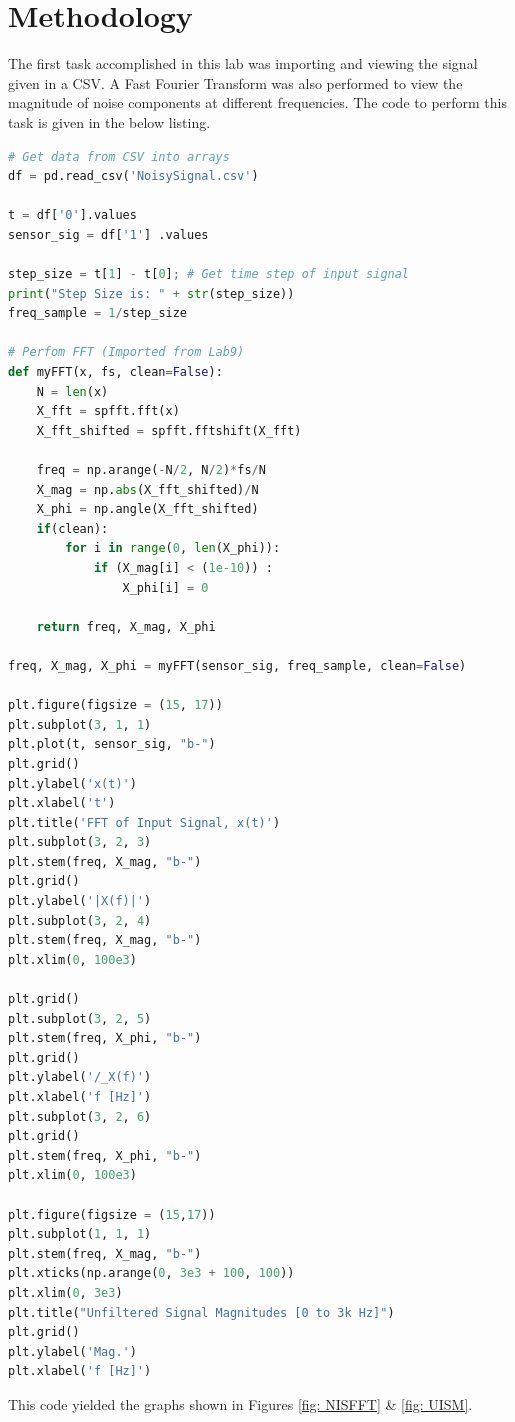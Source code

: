 \documentclass[12pt]{report}
\begin{document}
\section{Methodology}\label{section: Methodology}
The first task accomplished in this lab was importing and viewing the signal given in a CSV. A Fast Fourier Transform was also
performed to view the magnitude of noise components at different frequencies. The code to perform this task is given in the below
listing.

\begin{lstlisting}[language=Python, basicstyle=\footnotesize]
# Get data from CSV into arrays
df = pd.read_csv('NoisySignal.csv')

t = df['0'].values
sensor_sig = df['1'] .values

step_size = t[1] - t[0]; # Get time step of input signal
print("Step Size is: " + str(step_size))
freq_sample = 1/step_size

# Perfom FFT (Imported from Lab9)
def myFFT(x, fs, clean=False):
    N = len(x)
    X_fft = spfft.fft(x)
    X_fft_shifted = spfft.fftshift(X_fft)
    
    freq = np.arange(-N/2, N/2)*fs/N
    X_mag = np.abs(X_fft_shifted)/N
    X_phi = np.angle(X_fft_shifted)
    if(clean):
        for i in range(0, len(X_phi)):
            if (X_mag[i] < (1e-10)) :
                X_phi[i] = 0
        
    return freq, X_mag, X_phi

freq, X_mag, X_phi = myFFT(sensor_sig, freq_sample, clean=False)

plt.figure(figsize = (15, 17))
plt.subplot(3, 1, 1)
plt.plot(t, sensor_sig, "b-")
plt.grid()
plt.ylabel('x(t)')
plt.xlabel('t')
plt.title('FFT of Input Signal, x(t)')
plt.subplot(3, 2, 3)
plt.stem(freq, X_mag, "b-")
plt.grid()
plt.ylabel('|X(f)|')
plt.subplot(3, 2, 4)
plt.stem(freq, X_mag, "b-")
plt.xlim(0, 100e3)

plt.grid()
plt.subplot(3, 2, 5)
plt.stem(freq, X_phi, "b-")
plt.grid()
plt.ylabel('/_X(f)')
plt.xlabel('f [Hz]')
plt.subplot(3, 2, 6)
plt.grid()
plt.stem(freq, X_phi, "b-")
plt.xlim(0, 100e3)

plt.figure(figsize = (15,17))
plt.subplot(1, 1, 1)
plt.stem(freq, X_mag, "b-")
plt.xticks(np.arange(0, 3e3 + 100, 100))
plt.xlim(0, 3e3)
plt.title("Unfiltered Signal Magnitudes [0 to 3k Hz]")
plt.grid()
plt.ylabel('Mag.')
plt.xlabel('f [Hz]')
\end{lstlisting}

This code yielded the graphs shown in Figures \ref{fig: NISFFT} \& \ref{fig: UISM}.
\end{document}
